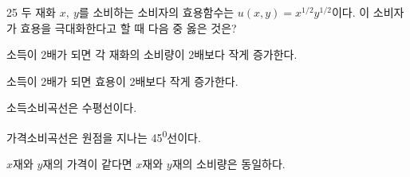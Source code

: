 \begin{question}{25}
두 재화 $x,~y$를 소비하는 소비자의 효용함수는 $u(x,y)=x^{ 1/2 } y^{ 1/2 }$이다. 이 소비자가 효용을 극대화한다고 할 때 다음 중 옳은 것은?
\begin{choices}
  \item 소득이 2배가 되면 각 재화의 소비량이 2배보다 작게 증가한다.
  \item 소득이 2배가 되면 효용이 2배보다 작게 증가한다.
  \item 소득소비곡선은 수평선이다.
  \item 가격소비곡선은 원점을 지나는 45\textsuperscript{0}선이다.
  \item $x$재와 $y$재의 가격이 같다면 $x$재와 $y$재의 소비량은 동일하다.
\end{choices}
\end{question}
